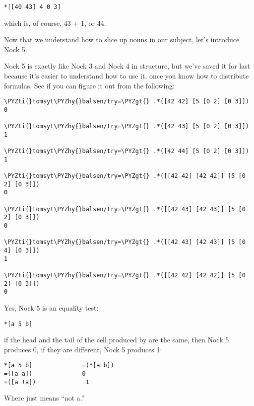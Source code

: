 \begin{framed_shaded}
\begin{Verbatim}[fontsize=\relsize{-2.5},fontseries=b,commandchars=\\\{\}]
*[[40 43] 4 0 3]
\end{Verbatim}
\end{framed_shaded}
which is, of course, 43 + 1, or 44.

Now that we understand how to slice up nouns in our subject, let's introduce Nock 5. 

Nock 5 is exactly like Nock 3 and Nock 4 in structure, but we've saved it for
last because it's easier to understand how to use it, once you know how to
distribute formulas. See if you can figure it out from the following:

\begin{framed_shaded}
\begin{Verbatim}[fontsize=\relsize{-2.5},fontseries=b,commandchars=\\\{\}]
\PYZti{}tomsyt\PYZhy{}balsen/try=\PYZgt{} .*([42 42] [5 [0 2] [0 3]])
0

\PYZti{}tomsyt\PYZhy{}balsen/try=\PYZgt{} .*([42 43] [5 [0 2] [0 3]])
1

\PYZti{}tomsyt\PYZhy{}balsen/try=\PYZgt{} .*([42 44] [5 [0 2] [0 3]])
1

\PYZti{}tomsyt\PYZhy{}balsen/try=\PYZgt{} .*([[42 42] [42 42]] [5 [0 2] [0 3]])
0

\PYZti{}tomsyt\PYZhy{}balsen/try=\PYZgt{} .*([[42 43] [42 43]] [5 [0 2] [0 3]])
0

\PYZti{}tomsyt\PYZhy{}balsen/try=\PYZgt{} .*([[42 43] [42 43]] [5 [0 4] [0 3]])
1

\PYZti{}tomsyt\PYZhy{}balsen/try=\PYZgt{} .*([[42 42] [42 42]] [5 [0 2] [0 3]])
0
\end{Verbatim}
\end{framed_shaded}
Yes, Nock 5 is an equality test:

\begin{framed_shaded}
\begin{Verbatim}[fontsize=\relsize{-2.5},fontseries=b,commandchars=\\\{\}]
*[a 5 b] 
\end{Verbatim}
\end{framed_shaded}
if the head and the tail of the cell produced by \kode{*[a b]} are the same, then
Nock 5 produces 0, if they are different, Nock 5 produces 1:

\begin{framed_shaded}
\begin{Verbatim}[fontsize=\relsize{-2.5},fontseries=b,commandchars=\\\{\}]
*[a 5 b]              =(*[a b])
=([a a])              0 
=([a !a])              1
\end{Verbatim}
\end{framed_shaded}
Where  just means ``not a.''

